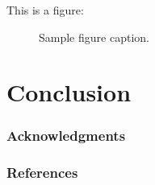 \documentclass{article} %
\begin{document}
This is a figure:

\begin{figure}[h]
\begin{center}
\fbox{\rule[-.5cm]{0cm}{4cm} \rule[-.5cm]{4cm}{0cm}}
\end{center}
\caption{Sample figure caption.}
\end{figure}

\section{Conclusion}


\subsubsection*{Acknowledgments}



\subsubsection*{References}






\end{document}
